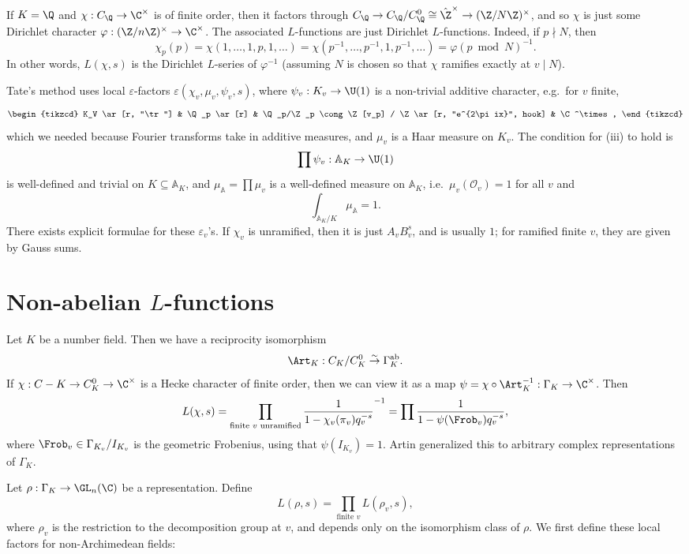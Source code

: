 \documentclass[a4paper]{article}
\newcommand\A{\mathbb{A}}
\newcommand\ab{\mathrm{ab}}
\begin{document}
If $K = \Q$ and $\chi: C_\Q \to \C^\times$ is of finite order, then it factors through $C_\Q \to C_\Q/C_\Q^0 \cong \hat{\Z}^\times \to (\Z/N\Z)^\times$, and so $\chi$ is just some Dirichlet character $\varphi: (\Z/n\Z)^\times \to \C^\times$. The associated $L$-functions are just Dirichlet $L$-functions. Indeed, if $p \nmid N$, then
\[
  \chi_p(p) = \chi(1, \ldots, 1, p, 1, \ldots) = \chi(p^{-1}, \ldots, p^{-1}, 1, p^{-1}, \ldots) = \varphi(p\bmod N)^{-1}.
\]
In other words, $L(\chi, s)$ is the Dirichlet $L$-series of $\varphi^{-1}$ (assuming $N$ is chosen so that $\chi$ ramifies exactly at $v \mid N$).

Tate's method uses local $\varepsilon$-factors $\varepsilon(\chi_v, \mu_v, \psi_v, s)$, where $\psi_v: K_v \to \U(1)$ is a non-trivial additive character, e.g.\ for $v$ finite,
\[
  \begin{tikzcd}
    K_V \ar[r, "\tr"] & \Q_p \ar[r] & \Q_p/\Z_p \cong \Z[v_p] / \Z \ar[r, "e^{2\pi ix}", hook] & \C^\times,
  \end{tikzcd}
\]
which we needed because Fourier transforms take in additive measures, and $\mu_v$ is a Haar measure on $K_v$. The condition for (iii) to hold is
\[
  \prod \psi_v: \A_K \to \U(1)
\]
is well-defined and trivial on $K \subseteq \A_K$, and $\mu_\A = \prod \mu_v$ is a well-defined measure on $\A_K$, i.e.\ $\mu_v(\mathcal{O}_v) = 1$ for all $v$ and
\[
  \int_{\A_K/K} \mu_\A = 1.
\]
There exists explicit formulae for these $\varepsilon_v$'s. If $\chi_v$ is unramified, then it is just $A_v B_v^s$, and is usually $1$; for ramified finite $v$, they are given by Gauss sums.

\section{Non-abelian \texorpdfstring{$L$}{L}-functions}
Let $K$ be a number field. Then we have a reciprocity isomorphism
\[
  \Art_K: C_K/C_K^0 \overset{\sim}{\to} \Gamma_K^{\ab}.
\]
If $\chi: C-K \to C_K^0 \to \C^\times$ is a Hecke character of finite order, then we can view it as a map $\psi = \chi \circ \Art_K^{-1}: \Gamma_K \to \C^\times$. Then
\[
  L(\chi, s) = \prod_{\text{finite }v\text{ unramified}} \frac{1}{1 - \chi_v(\pi_v) q_v^{-s}}^{-1} = \prod \frac{1}{1 - \psi(\Frob_v) q_v^{-s}},
\]
where $\Frob_v \in \Gamma_{K_v}/I_{K_v}$ is the geometric Frobenius, using that $\psi(I_{K_v}) = 1$. Artin generalized this to arbitrary complex representations of $\Gamma_K$.

Let $\rho: \Gamma_K \to \GL_n(\C)$ be a representation. Define
\[
  L(\rho, s) = \prod_{\text{finite }v} L(\rho_v, s),
\]
where $\rho_v$ is the restriction to the decomposition group at $v$, and depends only on the isomorphism class of $\rho$. We first define these local factors for non-Archimedean fields:
\end{document}
